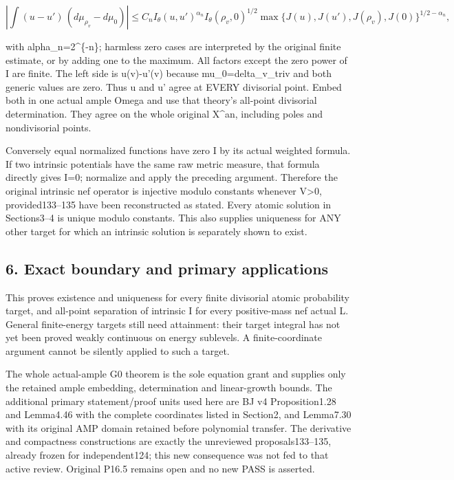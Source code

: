 \documentclass[
  10pt,
]{article}
\begin{document}
\[\left|\int(u-u')\,(d\mu_{\rho_v}-d\mu_0)\right|
\leq C_n I_\theta(u,u')^{\alpha_n} I_\theta(\rho_v,0)^{1/2}
\max\{J(u),J(u'),J(\rho_v),J(0)\}^{1/2-\alpha_n},\]

with alpha\_n=2\^{}\{-n\}; harmless zero cases are interpreted by the
original finite estimate, or by adding one to the maximum. All factors
except the zero power of I are finite. The left side is
\textbar u(v)-u'(v)\textbar{} because mu\_0=delta\_v\_triv and both
generic values are zero. Thus u and u' agree at EVERY divisorial point.
Embed both in one actual ample Omega and use that theory's all-point
divisorial determination. They agree on the whole original X\^{}an,
including poles and nondivisorial points.

Conversely equal normalized functions have zero I by its actual weighted
formula. If two intrinsic potentials have the same raw metric measure,
that formula directly gives I=0; normalize and apply the preceding
argument. Therefore the original intrinsic nef operator is injective
modulo constants whenever V\textgreater0, provided133--135 have been
reconstructed as stated. Every atomic solution in Sections3--4 is unique
modulo constants. This also supplies uniqueness for ANY other target for
which an intrinsic solution is separately shown to exist.

\subsection{6. Exact boundary and primary
applications}\label{exact-boundary-and-primary-applications}

This proves existence and uniqueness for every finite divisorial atomic
probability target, and all-point separation of intrinsic I for every
positive-mass nef actual L. General finite-energy targets still need
attainment: their target integral has not yet been proved weakly
continuous on energy sublevels. A finite-coordinate argument cannot be
silently applied to such a target.

The whole actual-ample G0 theorem is the sole equation grant and
supplies only the retained ample embedding, determination and
linear-growth bounds. The additional primary statement/proof units used
here are BJ v4 Proposition1.28 and Lemma4.46 with the complete
coordinates listed in Section2, and Lemma7.30 with its original AMP
domain retained before polynomial transfer. The derivative and
compactness constructions are exactly the unreviewed proposals133--135,
already frozen for independent124; this new consequence was not fed to
that active review. Original P16.5 remains open and no new PASS is
asserted.
\end{document}
